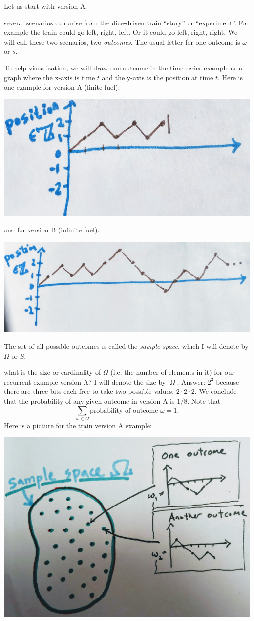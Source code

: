 \documentclass{article}
\begin{document}
Let us start with version A. 

 several scenarios can arise from the dice-driven train ``story'' or ``experiment''. For example the train could go left, right, left. Or it could go left, right, right. We will call these two scenarios, two \emph{outcomes}. The usual letter for one outcome is $\omega$ or $s$. 

To help visualization, we will draw one outcome in the time series example as a graph where the x-axis is time $t$ and the y-axis is the position at time $t$. Here is one example for version A (finite fuel):
\begin{center}
\includegraphics[width=0.5\linewidth]{figures/train1}
\end{center}
and for version B (infinite fuel):
\begin{center}
	\includegraphics[width=0.5\linewidth]{figures/train2}
\end{center}

 The set of all possible outcomes is called the \emph{sample space}, which I will denote by $\Omega$ or $S$. 

 what is the size or cardinality of $\Omega$ (i.e. the number of elements in it) for our recurrent example version A? I will denote the size by $|\Omega|$. Answer: $2^3$ because there are three bits each free to take two possible values, $2 \cdot 2 \cdot 2$. We conclude that the probability of any given outcome in version A is $1/8$. Note that 
\[ \sum_{\omega \in \Omega} \text{probability of outcome $\omega$} = 1. \]
Here is a picture for the train version A example:
\begin{center}
	\includegraphics[width=0.5\linewidth]{figures/outcomes}
\end{center}
\end{document}

